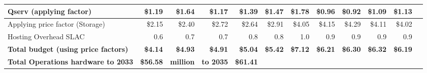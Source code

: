 \begin{longtable} { |p{}  |r  |r  |r  |r  |r  |r  |r  |r  |r  |r  |r |}
{Qserv (applying factor)}&{\$1.19}&{\$1.64}&{\$1.17}&{\$1.39}&{\$1.47}&{\$1.78}&{\$0.96}&{\$0.92}&{\$1.09}&{\$1.13} \\ \hline
{Applying price factor (Storage)}&{\$2.15}&{\$2.40}&{\$2.72}&{\$2.64}&{\$2.91}&{\$4.05}&{\$4.15}&{\$4.29}&{\$4.11}&{\$4.02} \\ \hline
{Hosting Overhead SLAC
}&{0.6}&{0.7}&{0.7}&{0.8}&{0.8}&{1.0}&{0.9}&{0.9}&{0.9}&{0.9} \\ \hline
\textbf{Total budget (using price factors)}&\textbf{\$4.14}&\textbf{\$4.93}&\textbf{\$4.91}&\textbf{\$5.04}&\textbf{\$5.42}&\textbf{\$7.12}&\textbf{\$6.21}&\textbf{\$6.30}&\textbf{\$6.32}&\textbf{\$6.19} \\ \hline
\textbf{Total Operations hardware to 2033}&\textbf{\$56.58}&\textbf{million}&\textbf{to 2035}&\textbf{\$61.41}&&&&&& \\ \hline
\end{longtable} \normalsize
